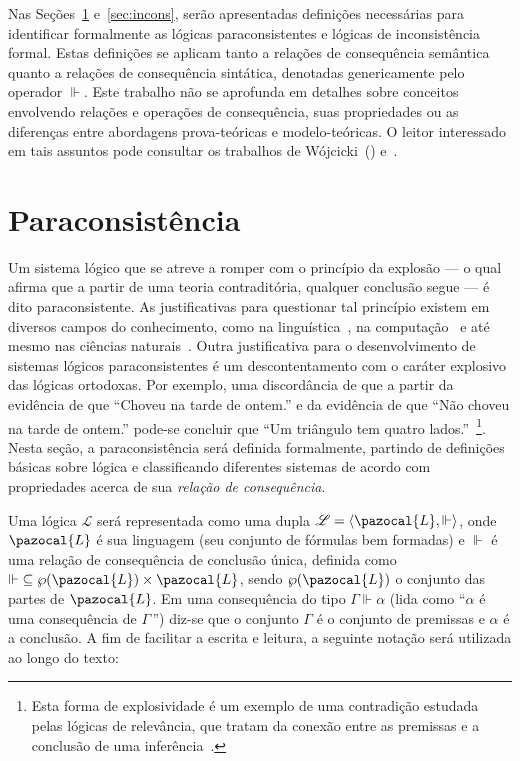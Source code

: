 Nas Seções~\ref{sec:paracons} e~\ref{sec:incons}, serão apresentadas definições necessárias para identificar formalmente as lógicas paraconsistentes e lógicas de inconsistência formal. Estas definições se aplicam tanto a relações de consequência semântica quanto a relações de consequência sintática, denotadas genericamente pelo operador $\Vdash$. Este trabalho não se aprofunda em detalhes sobre conceitos envolvendo relações e operações de consequência, suas propriedades ou as diferenças entre abordagens prova-teóricas e modelo-teóricas. O leitor interessado em tais assuntos pode consultar os trabalhos de Wójcicki~(\citeyear{Wojcicki1984-WJCLOP,Wojcicki1988-WOJAAT,Wojcicki1988-WOJTOL}) e~.

\section{Paraconsistência}\label{sec:paracons}
    Um sistema lógico que se atreve a romper com o princípio da explosão {---} o qual afirma que a partir de uma teoria contraditória, qualquer conclusão segue {---} é dito paraconsistente. As justificativas para questionar tal princípio existem em diversos campos do conhecimento, como na linguística~\cite{McGinnis2013-MCGTUA}, na computação~\cite{carnielli2000formal} e até mesmo nas ciências naturais~\cite{Brown2015-BROCAP-9}. Outra justificativa para o desenvolvimento de sistemas lógicos paraconsistentes é um descontentamento com o caráter explosivo das lógicas ortodoxas. Por exemplo, uma discordância de que a partir da evidência de que ``Choveu na tarde de ontem.'' e da evidência de que ``Não choveu na tarde de ontem.'' pode-se concluir que ``Um triângulo tem quatro lados.''~\footnote{Esta forma de explosividade é um exemplo de uma contradição estudada pelas lógicas de relevância, que tratam da conexão entre as premissas e a conclusão de uma inferência~\cite{sep-logic-relevance}.}. Nesta seção, a paraconsistência será definida formalmente, partindo de definições básicas sobre lógica e classificando diferentes sistemas de acordo com propriedades acerca de sua \textit{relação de consequência}.

    Uma lógica $\mathcal{L}$ será representada como uma dupla $\mathcal{L} = \langle \pazocal{L},\Vdash \rangle$, onde $\pazocal{L}$ é sua linguagem (seu conjunto de fórmulas bem formadas) e $\Vdash$ é uma relação de consequência de conclusão única, definida como $\Vdash \;\subseteq \wp(\pazocal{L})\times\pazocal{L}$, sendo $\wp(\pazocal{L})$ o conjunto das partes de $\pazocal{L}$. Em uma consequência do tipo $\Gamma \Vdash \alpha$ (lida como ``$\alpha$ é uma consequência de $\Gamma$\,'') diz-se que o conjunto $\Gamma$ é o conjunto de premissas e $\alpha$ é a conclusão. A fim de facilitar a escrita e leitura, a seguinte notação será utilizada ao longo do texto:

